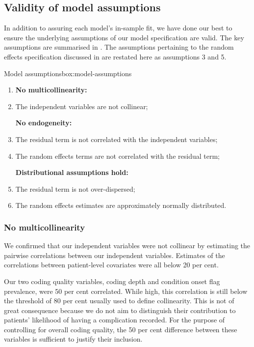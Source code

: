 \documentclass[submission]{grattan}
\begin{document}
\subsection{Validity of model assumptions}\label{subsec:validity-of-model-assumptions}

In addition to assuring each model's in-sample fit, we have done our best to ensure the underlying assumptions of our model specification are valid.
The key assumptions are summarised in .
The assumptions pertaining to the random effects specification discussed in  are restated here as assumptions 3 and 5.

\begin{smallbox}{Model assumptions}{box:model-assumptions}

\begin{enumerate}[leftmargin=*]
\item[]\textbf{No multicollinearity: }

\item The independent variables are not collinear;

\textbf{No endogeneity: }

\item The residual term is not correlated with the independent variables;

\item The random effects terms are not correlated with the residual term;

\textbf{Distributional assumptions hold:}

\item The residual term is not over-dispersed;

\item The random effects estimates are approximately normally distributed.
\end{enumerate}
\end{smallbox}
\subsubsection{No multicollinearity}\label{subsubsec:no-multicollinearity}

We confirmed that our independent variables were not collinear by estimating the pairwise correlations between our independent variables.
Estimates of the correlations between patient-level covariates were all below 20 per cent.

Our two coding quality variables, coding depth and condition onset flag prevalence, were 50 per cent correlated.
While high, this correlation is still below the threshold of 80 per cent usually used to define collinearity.
This is not of great consequence because we do not aim to distinguish their contribution to patients' likelihood of having a complication recorded.
For the purpose of controlling for overall coding quality, the 50 per cent difference between these variables is sufficient to justify their inclusion.
\end{document}
